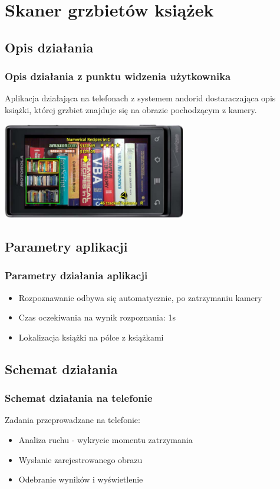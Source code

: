 \section{Skaner grzbietów książek}
\nextoc


\subsection{Opis działania}
\begin{frame}
    \frametitle{Opis działania z punktu widzenia użytkownika}
    Aplikacja działająca na telefonach z systemem andorid dostaraczająca opis książki, której grzbiet znajduje się na obrazie pochodzącym z kamery.
    
    \begin{center}
    \includegraphics[width=0.6\textwidth]{books_main}
    \end{center}
    
\end{frame}

\subsection{Parametry aplikacji}

\begin{frame}
    \frametitle{Parametry działania aplikacji}
    \begin{itemize}
        \item Rozpoznawanie odbywa się automatycznie, po zatrzymaniu kamery
        \item Czas oczekiwania na wynik rozpoznania: 1s
        \item Lokalizacja książki na pólce z książkami
    \end{itemize}
\end{frame}


\subsection{Schemat działania}
\begin{frame}
    \frametitle{Schemat działania na telefonie}
    Zadania przeprowadzane na telefonie:
    \begin{itemize}
        \item Analiza ruchu - wykrycie momentu zatrzymania
        \item Wysłanie zarejestrowanego obrazu
        \item Odebranie wyników i wyświetlenie
    \end{itemize}
\end{frame}

